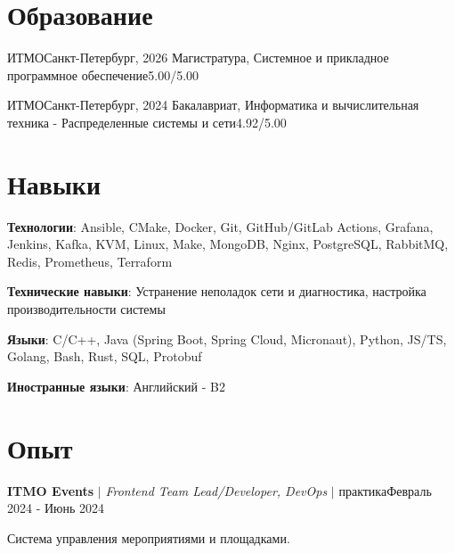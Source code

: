\documentclass[letterpaper,11pt]{article}
\begin{document}
\section{Образование}
\resumeSubHeadingListStart
  \resumeSubheading
    {ИТМО}{Санкт-Петербург, 2026}
    {Магистратура, Системное и прикладное программное обеспечение}{5.00/5.00}

  \resumeSubheading
    {ИТМО}{Санкт-Петербург, 2024}
    {Бакалавриат, Информатика и вычислительная техника - Распределенные системы и сети}{4.92/5.00}

\resumeSubHeadingListEnd

\section{Навыки}
\resumeSubHeadingListStart
  \small{\item{
    \textbf{Технологии}{: Ansible, CMake, Docker, Git, GitHub/GitLab Actions, Grafana, Jenkins, Kafka, KVM, Linux, Make, MongoDB, Nginx, PostgreSQL, RabbitMQ, Redis, Prometheus, Terraform }

    \textbf{Технические навыки}{: Устранение неполадок сети и диагностика, настройка производительности системы}

   \textbf{Языки}{: C/C++, Java (Spring Boot, Spring Cloud, Micronaut), Python, JS/TS, Golang, Bash, Rust, SQL, Protobuf }

   \textbf{Иностранные языки}{: Английский - B2}%
  }}
\resumeSubHeadingListEnd

\section{Опыт}
\resumeSubHeadingListStart
  \resumeExperienceHeading
    {\textbf{ITMO Events} $|$ \footnotesize\emph{Frontend Team Lead/Developer, DevOps} $|$ практика}{Февраль 2024 - Июнь 2024}

    {\vspace{-10pt}\small Система управления мероприятиями и площадками.\vspace{-7pt}}

  \resumeItemListStart
  \resumeItemListEnd
\end{document}
